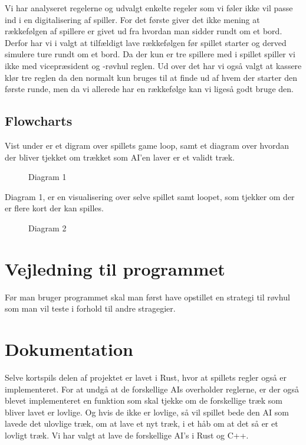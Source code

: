 \documentclass[a4paper, 12pt]{article}
\begin{document}
\begin{multicols}{2}
Vi har analyseret regelerne og udvalgt enkelte regeler som vi føler ikke vil passe ind i en digitalisering af spiller. For det første giver det ikke mening at rækkefølgen af spillere er givet ud fra hvordan man sidder rundt om et bord. Derfor har vi i valgt at tilfældigt lave rækkefølgen før spillet starter og derved simulere ture rundt om et bord. Da der kun er tre spillere med i spillet spiller vi ikke med vicepræsident og -røvhul reglen.
Ud over det har vi også valgt at kassere klør tre reglen da den normalt kun bruges til at finde ud af hvem der starter den første runde, men da vi allerede har en rækkefølge kan vi ligeså godt bruge den.

\vfill
\pagebreak

\subsection{Flowcharts}
Vist under er et digram over spillets game loop, samt et diagram over hvordan der bliver tjekket om trækket som AI'en laver er et validt træk.
\begin{figure}[H]
	\centering
	\resizebox{.5\linewidth}{!}{}
	\caption{Diagram 1}
\end{figure}
Diagram 1, er en visualisering over selve spillet samt loopet, som tjekker om der er flere kort der kan spilles.
\bigbreak

\begin{figure}[H]
	\centering
	\resizebox{.5\linewidth}{!}{}
	\caption{Diagram 2}
\end{figure}



\section{Vejledning til programmet}

Før man bruger programmet skal man først have opstillet en strategi til røvhul som man vil teste i forhold til andre stragegier. 



\vfill
\pagebreak

\section{Dokumentation}

Selve kortspils delen af projektet er lavet i Rust, hvor at spillets regler også er implementeret. For at undgå at de forskellige AIs overholder reglerne, er der også blevet implementeret en funktion som skal tjekke om de forskellige træk som bliver lavet er lovlige. Og hvis de ikke er lovlige, så vil spillet bede den AI som lavede det ulovlige træk, om at lave et nyt træk, i et håb om at det så er et lovligt træk. Vi har valgt at lave de forskellige AI's i Rust og C++.
\vfill


\end{multicols}
\end{document}
